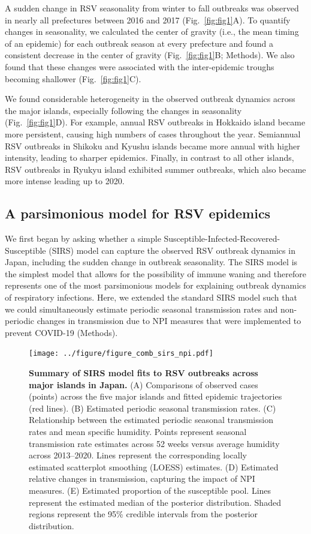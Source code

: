 \documentclass[12pt]{article}
\newcommand{\fref}[1]{Fig.~\ref{fig:#1}}
\begin{document}
A sudden change in RSV seasonality from winter to fall outbreaks was observed in nearly all prefectures between 2016 and 2017 (\fref{fig1}A).
To quantify changes in seasonality, we calculated the center of gravity (i.e., the mean timing of an epidemic) for each outbreak season at every prefecture and found a consistent decrease in the center of gravity (\fref{fig1}B; Methods). 
We also found that these changes were associated with the inter-epidemic troughs becoming shallower (\fref{fig1}C).

We found considerable heterogeneity in the observed outbreak dynamics across the major islands, especially following the changes in seasonality (\fref{fig1}D).
For example, annual RSV outbreaks in Hokkaido island became more persistent, causing high numbers of cases throughout the year.
Semiannual RSV outbreaks in Shikoku and Kyushu islands became more annual with higher intensity, leading to sharper epidemics.
Finally, in contrast to all other islands, RSV outbreaks in Ryukyu island exhibited summer outbreaks, which also became more intense leading up to 2020.

\subsection*{A parsimonious model for RSV epidemics}

We first began by asking whether a simple Susceptible-Infected-Recovered-Susceptible (SIRS) model can capture the observed RSV outbreak dynamics in Japan, including the sudden change in outbreak seasonality.
The SIRS model is the simplest model that allows for the possibility of immune waning and therefore represents one of the most parsimonious models for explaining outbreak dynamics of respiratory infections.
Here, we extended the standard SIRS model such that we could simultaneously estimate periodic seasonal transmission rates and non-periodic changes in transmission due to NPI measures that were implemented to prevent COVID-19  (Methods).

\begin{figure}[!th]
\texttt{[image: ../figure/figure\_comb\_sirs\_npi.pdf]}
\caption{
\textbf{Summary of SIRS model fits to RSV outbreaks across major islands in Japan.}
(A) Comparisons of observed cases (points) across the five major islands and fitted epidemic trajectories (red lines).
(B) Estimated periodic seasonal transmission rates.
(C) Relationship between the estimated periodic seasonal transmission rates and mean specific humidity.
Points represent seasonal transmission rate estimates across 52 weeks versus average humidity across 2013--2020.
Lines represent the corresponding locally estimated scatterplot smoothing (LOESS) estimates.
(D) Estimated relative changes in transmission, capturing the impact of NPI measures.
(E) Estimated proportion of the susceptible pool.
Lines represent the estimated median of the posterior distribution.
Shaded regions represent the 95\% credible intervals from the posterior distribution.
}
\label{fig:fig2}
\end{figure}
\end{document}
